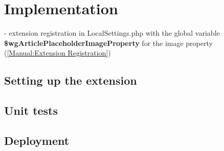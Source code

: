 \chapter{Implementation}
	
	- extension registration in LocalSettings.php with the global variable \textbf{\$wgArticlePlaceholderImageProperty} for the image property (\href{https://www.mediawiki.org/wiki/Manual:Extension_registration}{[Manual:Extension Registration]})\\
	\section{Setting up the extension}
	
	
	
	
	
	
	\section{Unit tests}
	\section{Deployment}
	